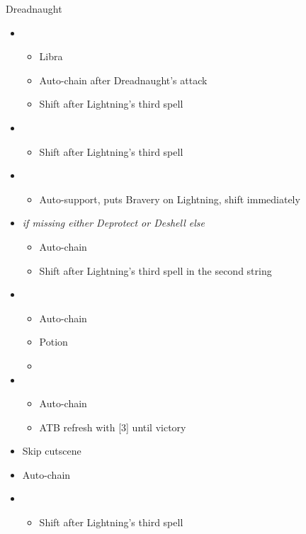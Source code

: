 \documentclass{report}
\begin{document}
\begin{battle}{Dreadnaught}
\begin{multicols}{2}
\begin{itemize}
    \item \fourth
    \begin{itemize}
        \item Libra
        \item Auto-chain after Dreadnaught's attack
        \item Shift after Lightning's third spell
    \end{itemize}
    \item \sixth
    \begin{itemize}
        \item Shift after Lightning's third spell
    \end{itemize}
    \item \second
    \begin{itemize}
        \item Auto-support, puts Bravery on Lightning, shift immediately
    \end{itemize}
    \item \fourth \textit{if missing either Deprotect or Deshell else} \sixth
    \begin{itemize}
        \item Auto-chain
        \item Shift after Lightning's third spell in the second string
    \end{itemize}
    \item \fifth
    \begin{itemize}
        \item Auto-chain
        \item Potion
        \item \stagger
    \end{itemize}
    \item \first
    \begin{itemize}
        \item Auto-chain
        \item ATB refresh with [3] until victory
    \end{itemize}
    \item Skip cutscene
    \item Auto-chain
    \item \sixth
    \begin{itemize}
        \item Shift after Lightning's third spell
    \end{itemize}

\end{itemize}
\end{multicols}
\end{battle}
\end{document}
